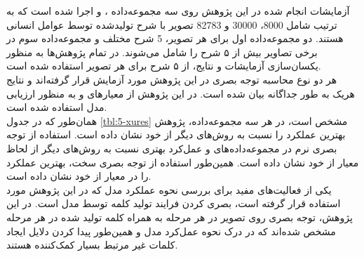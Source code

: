 آزمایشات انجام شده در این پژوهش روی سه مجموعه‌داده
،
 و
اجرا شده است که به ترتیب شامل 8000، 30000 و 82783 تصویر با شرح تولید‌شده توسط عوامل انسانی هستند. دو مجموعه‌داده اول برای هر تصویر، 5 شرح مختلف و مجموعه‌داده سوم در برخی تصاویر بیش از ۵ شرح را شامل می‌شوند. در تمام پژوهش‌ها به منظور یکسان‌سازی آزمایشات و نتایج، از ۵ شرح برای هر تصویر استفاده شده است. 
\\
هر دو نوع محاسبه توجه بصری در این پژوهش مورد آزمایش قرار گرفته‌اند و نتایج هریک به طور جداگانه بیان شده است. در این پژوهش از معیارهای  و  به منظور ارزیابی مدل استفاده شده است.
\\
همان‌طور که در جدول \ref{tbl:5-xures} مشخص است، در هر سه مجموعه‌داده،‌ پژوهش \cite{xu2015show} بهترین عملکرد را نسبت به روش‌های دیگر از خود نشان داده است. استفاده از توجه بصری نرم در مجموعه‌داده‌های  و  عمل‌کرد بهتری نسبت به روش‌های دیگر از لحاظ معیار  از خود نشان داده‌ است. همین‌طور استفاده از توجه بصری سخت، بهترین عملکرد را در معیار  از خود نشان داده است.
\\
یکی از فعالیت‌های مفید برای بررسی نحوه عملکرد مدل که در این پژوهش مورد استفاده قرار گرفته است، بصری کردن فرایند تولید کلمه توسط مدل است. در این پژوهش، توجه بصری روی تصویر در هر مرحله به همراه کلمه تولید شده در هر مرحله مشخص شده‌اند که در درک نحوه عمل‌کرد مدل و همین‌طور پیدا کردن دلایل ایجاد کلمات غیر مرتبط بسیار کمک‌کننده هستند.  


